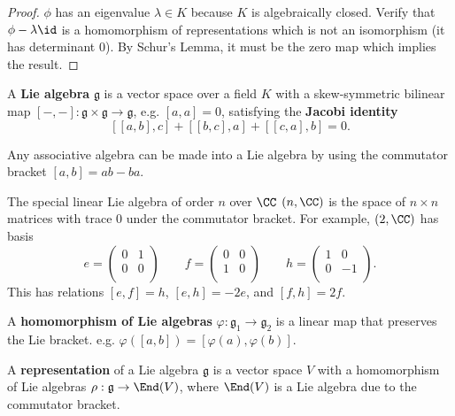 \documentclass{article}
\begin{document}
\begin{proof}
$\phi$ has an eigenvalue $\lambda \in K$ because $K$ is algebraically closed.
Verify that $\phi - \lambda \id$ is a homomorphism of representations which is
not an isomorphism (it has determinant $0$). By Schur's Lemma, it must be the
zero map which implies the result.
\end{proof}

\begin{df}
A \textbf{Lie algebra} $\mathfrak{g}$ is a vector space over a field $K$ with a
skew-symmetric bilinear map $[-,-] : \mathfrak{g} \times \mathfrak{g} \to
\mathfrak{g}$, e.g. $[a, a] = 0$, satisfying the \textbf{Jacobi identity}
\[ [[a, b], c] + [[b, c], a] + [[c, a], b] = 0. \]
\end{df}

\begin{ex}
Any associative algebra can be made into a Lie algebra by using the commutator
bracket $[a, b] = ab - ba$.
\end{ex}

\begin{ex}
The special linear Lie algebra of order $n$ over $\CC$ $\sl(n, \CC)$ is the
space of $n \times n$ matrices with trace $0$ under the commutator bracket. For
example, $\sl(2, \CC)$ has basis
\[ e = \begin{pmatrix} 0 & 1 \\ 0 & 0 \\ \end{pmatrix} \qquad f =
\begin{pmatrix} 0 & 0 \\ 1 & 0 \\ \end{pmatrix} \qquad h = \begin{pmatrix} 1 & 0
\\ 0 & -1 \\ \end{pmatrix}. \]
This has relations $[e, f] = h$, $[e, h] = -2e$, and $[f, h] = 2f$.
\end{ex}

\begin{df}
A \textbf{homomorphism of Lie algebras} $\varphi : \mathfrak{g}_1 \to
\mathfrak{g}_2$ is a linear map that preserves the Lie bracket. e.g.
$\varphi([a, b]) = [\varphi(a), \varphi(b)]$.
\end{df}

\begin{df}
A \textbf{representation} of a Lie algebra $\mathfrak{g}$ is a vector space $V$
with a homomorphism of Lie algebras $\rho : \mathfrak{g} \to \End(V)$, where
$\End(V)$ is a Lie algebra due to the commutator bracket.
\end{df}
\end{document}
